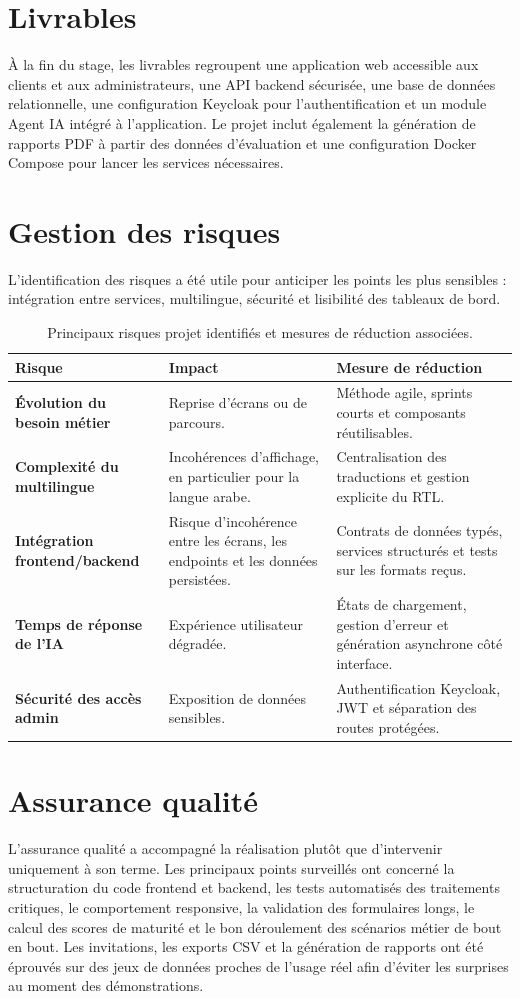 \documentclass[12pt,a4paper]{report}
\begin{document}
\section{Livrables}
À la fin du stage, les livrables regroupent une application web accessible aux clients et aux administrateurs, une API backend sécurisée, une base de données relationnelle, une configuration Keycloak pour l'authentification et un module Agent IA intégré à l'application. Le projet inclut également la génération de rapports PDF à partir des données d'évaluation et une configuration Docker Compose pour lancer les services nécessaires.

\section{Gestion des risques}
L'identification des risques a été utile pour anticiper les points les plus sensibles : intégration entre services, multilingue, sécurité et lisibilité des tableaux de bord.

\begin{table}[H]
\centering
\caption{Principaux risques projet identifiés et mesures de réduction associées.}
\small
\begin{tabularx}{\textwidth}{>{\bfseries}L{3.5cm}Y Y}
\toprule
Risque & Impact & Mesure de réduction \\
\midrule
Évolution du besoin métier & Reprise d'écrans ou de parcours. & Méthode agile, sprints courts et composants réutilisables. \\
Complexité du multilingue & Incohérences d'affichage, en particulier pour la langue arabe. & Centralisation des traductions et gestion explicite du RTL. \\
Intégration frontend/backend & Risque d'incohérence entre les écrans, les endpoints et les données persistées. & Contrats de données typés, services structurés et tests sur les formats reçus. \\
Temps de réponse de l'IA & Expérience utilisateur dégradée. & États de chargement, gestion d'erreur et génération asynchrone côté interface. \\
Sécurité des accès admin & Exposition de données sensibles. & Authentification Keycloak, JWT et séparation des routes protégées. \\
\bottomrule
\end{tabularx}
\end{table}

\section{Assurance qualité}
L'assurance qualité a accompagné la réalisation plutôt que d'intervenir uniquement à son terme. Les principaux points surveillés ont concerné la structuration du code frontend et backend, les tests automatisés des traitements critiques, le comportement responsive, la validation des formulaires longs, le calcul des scores de maturité et le bon déroulement des scénarios métier de bout en bout. Les invitations, les exports CSV et la génération de rapports ont été éprouvés sur des jeux de données proches de l'usage réel afin d'éviter les surprises au moment des démonstrations.
\end{document}
